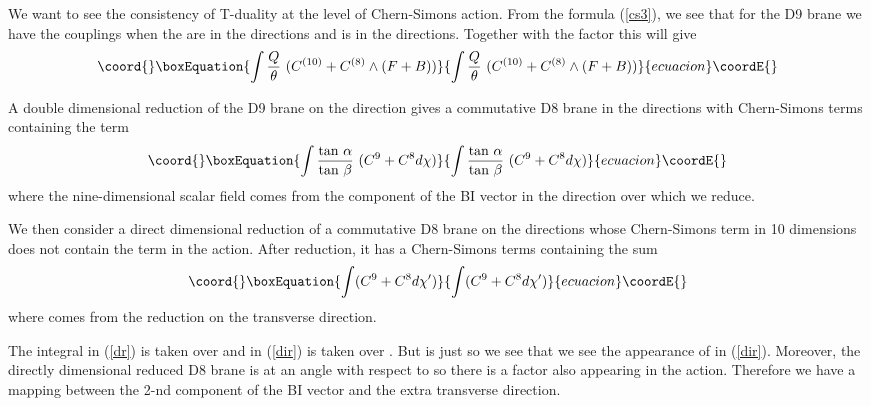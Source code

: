 \documentclass[a4paper,12pt]{article}
\begin{document}
We want to see the consistency of T-duality at the level 
of Chern-Simons action.
From the formula (\ref{cs3}), we see that for the D9 brane
 we have the couplings
\coordHE{} when the \coordHE{} are 
in the \coordHE{} directions and
\coordHE{} is in the \coordHE{} directions. 
Together with the factor \coordHE{} this will give
\begin{equation}\coord{}\boxEquation{
\label{d9}
 \int \frac{Q}{\theta}~(C^{(10)} + C^{(8)} \wedge (F + B)) 
}{
\int \frac{Q}{\theta}~(C^{(10)} + C^{(8)} \wedge (F + B)) 
}{ecuacion}\coordE{}\end{equation}

A double dimensional reduction of the D9 brane on the \coordHE{} direction gives a 
commutative D8 brane in the \coordHE{} directions with 
Chern-Simons terms containing the term
\begin{equation}\coord{}\boxEquation{
\label{dr}
\int  \frac{\mbox{tan}~\alpha}{\mbox{tan}~\beta}~(C^{9} + C^{8} d \chi)  
}{
\int  \frac{\mbox{tan}~\alpha}{\mbox{tan}~\beta}~(C^{9} + C^{8} d \chi)  
}{ecuacion}\coordE{}\end{equation}
where the nine-dimensional scalar field comes from
the component of the BI vector in the direction \coordHE{} over which we reduce.

We then consider a direct dimensional reduction of a commutative D8 brane 
on the  \coordHE{} directions whose Chern-Simons term in 
10 dimensions does not contain the   \coordHE{} term in the action.
After reduction, it has a Chern-Simons terms 
containing the sum 
\begin{equation}\coord{}\boxEquation{
\label{dir}
 \int  (C^{9} + C^{8} d \chi') 
}{
\int  (C^{9} + C^{8} d \chi') 
}{ecuacion}\coordE{}\end{equation}
where \coordHE{} comes from the reduction on the transverse direction.

The integral in (\ref{dr}) is taken over \coordHE{} and in (\ref{dir}) is taken
over \coordHE{}.  But \coordHE{} is just \coordHE{} so we
see that we see the appearance of \coordHE{} in (\ref{dir}).
Moreover, the directly dimensional reduced D8 brane is at an angle 
\myHighlight{$\beta$}\coordHE{} with respect to \coordHE{} so there is a factor \coordHE{} also
appearing in the action. Therefore we have a mapping between 
the 2-nd component of the BI vector and the extra transverse 
direction.
\end{document}
